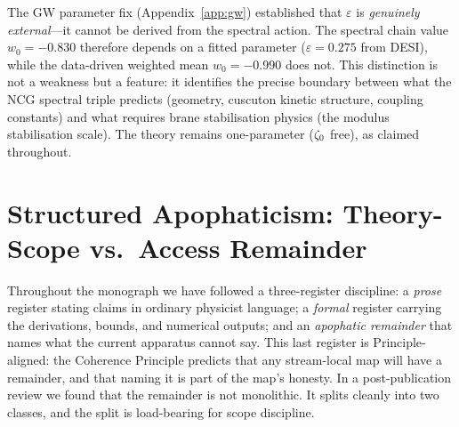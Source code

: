 The GW parameter fix (Appendix~\ref{app:gw}) established that $\varepsilon$ is \emph{genuinely external}---it cannot be derived from the spectral action. The spectral chain value $w_0 = -0.830$ therefore depends on a fitted parameter ($\varepsilon = 0.275$ from DESI), while the data-driven weighted mean $w_0 = -0.990$ does not. This distinction is not a weakness but a feature: it identifies the precise boundary between what the NCG spectral triple predicts (geometry, cuscuton kinetic structure, coupling constants) and what requires brane stabilisation physics (the modulus stabilisation scale). The theory remains one-parameter ($\zeta_0$ free), as claimed throughout.

\section{Structured Apophaticism: Theory-Scope vs.\ Access Remainder}
\label{app:val-apophatic}

Throughout the monograph we have followed a three-register discipline: a \emph{prose} register stating claims in ordinary physicist language; a \emph{formal} register carrying the derivations, bounds, and numerical outputs; and an \emph{apophatic remainder} that names what the current apparatus cannot say.  This last register is Principle-aligned: the Coherence Principle predicts that any stream-local map will have a remainder, and that naming it is part of the map's honesty.  In a post-publication review we found that the remainder is not monolithic.  It splits cleanly into two classes, and the split is load-bearing for scope discipline.

